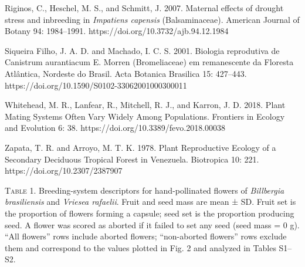 \documentclass[
]{article}
\begin{document}
Riginos, C., Heschel, M. S., and Schmitt, J. 2007. Maternal effects of
drought stress and inbreeding in \emph{Impatiens capensis}
(Balsaminaceae). American Journal of Botany 94: 1984--1991.
https://doi.org/10.3732/ajb.94.12.1984

Siqueira Filho, J. A. D. and Machado, I. C. S. 2001. Biologia
reprodutiva de Canistrum aurantiacum E. Morren (Bromeliaceae) em
remanescente da Floresta Atlântica, Nordeste do Brasil. Acta Botanica
Brasilica 15: 427--443. https://doi.org/10.1590/S0102-33062001000300011

Whitehead, M. R., Lanfear, R., Mitchell, R. J., and Karron, J. D. 2018.
Plant Mating Systems Often Vary Widely Among Populations. Frontiers in
Ecology and Evolution 6: 38. https://doi.org/10.3389/fevo.2018.00038

Zapata, T. R. and Arroyo, M. T. K. 1978. Plant Reproductive Ecology of a
Secondary Deciduous Tropical Forest in Venezuela. Biotropica 10: 221.
https://doi.org/10.2307/2387907

\textsc{\hfill\break
Table 1.} Breeding-system descriptors for hand-pollinated flowers of
\emph{Billbergia brasiliensis} and \emph{Vriesea rafaelii}. Fruit and
seed mass are mean ± SD. Fruit set is the proportion of flowers forming
a capsule; seed set is the proportion producing seed. A flower was
scored as aborted if it failed to set any seed (seed mass = 0 g). ``All
flowers'' rows include aborted flowers; ``non-aborted flowers'' rows
exclude them and correspond to the values plotted in Fig. 2 and analyzed
in Tables S1--S2.
\end{document}
